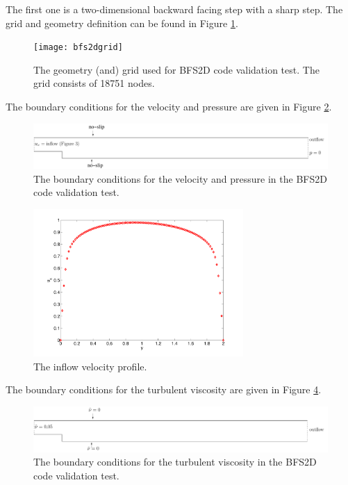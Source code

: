 \documentclass[twoside, 11pt, a4paper]{article}
\begin{document}
The first one is a two-dimensional backward facing step with a sharp step. The grid and
geometry definition can be found in Figure \ref{fig:bfsgrid}.

\begin{figure}[h]
    \begin{center}
        \texttt{[image: bfs2dgrid]}
    \end{center}
    \caption{The geometry (and) grid used for BFS2D code validation test. The grid consists of 18751 nodes.}
    \label{fig:bfsgrid}
\end{figure}

The boundary conditions for the velocity and pressure are given in Figure \ref{fig:bfsupbc}.
\begin{figure}[h]
    \begin{center}
        \includegraphics[width=14cm]{bfs2dupbc}
    \end{center}
    \caption{The boundary conditions for the velocity and pressure in the BFS2D code validation test.}
    \label{fig:bfsupbc}
\end{figure}
\begin{figure}[h]
    \begin{center}
        \includegraphics[width=8cm]{inflow}
    \end{center}
    \caption{The inflow velocity profile.}
    \label{fig:bfsinflow}
\end{figure}
The boundary conditions for the turbulent viscosity are given in Figure \ref{fig:bfsnutbc}.
\begin{figure}[h]
    \begin{center}
        \includegraphics[width=14cm]{bfs2dnutbc}
    \end{center}
    \caption{The boundary conditions for the turbulent viscosity in the BFS2D code validation test.}
    \label{fig:bfsnutbc}
\end{figure}
\end{document}
